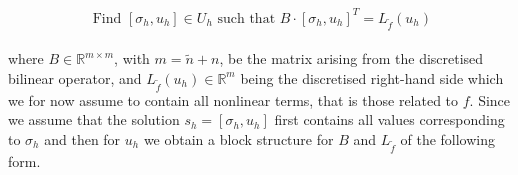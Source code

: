 \documentclass[../draft_1.tex]{subfiles}
\begin{document}
\begin{ceqn}
	\begin{align}
	\begin{aligned}
	\text{ Find } [\sigma_h, u_h] \in U_h \text{ such that } B \cdot [\sigma_h, u_h]^T  = L_{\tilde{f}}(u_h) 
	\end{aligned}
	\end{align}
\end{ceqn}

where $B \in \mathbb{R}^{m \times m}$, with $ m = \tilde{n} + n$, be the matrix arising from the discretised bilinear operator, and $L_{\tilde{f}}(u_h) \in \mathbb{R}^m$ being the discretised right-hand side which we for now assume to contain all nonlinear terms, that is those related to $f$. Since we assume that the solution $s_h = [\sigma_h, u_h]$ first contains all values corresponding to $\sigma_h$ and then for $u_h$ we obtain a block structure for $B$ and $L_{\tilde{f}}$ of the following form.
\end{document}
